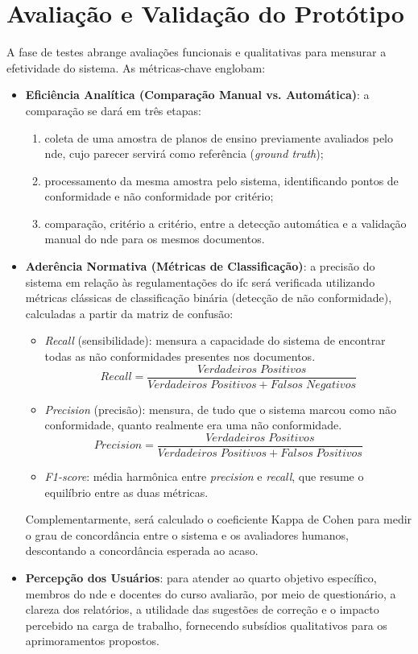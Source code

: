 \section{Avaliação e Validação do Protótipo}
A fase de testes abrange avaliações funcionais e qualitativas para mensurar a efetividade do sistema. As métricas-chave englobam:

\begin{itemize}
    \item \textbf{Eficiência Analítica (Comparação Manual vs. Automática)}: a comparação se dará em três etapas:
    \begin{enumerate}
        \item coleta de uma amostra de planos de ensino previamente avaliados pelo \gls{nde}, cujo parecer servirá como referência (\textit{ground truth});
        \item processamento da mesma amostra pelo sistema, identificando pontos de conformidade e não conformidade por critério;
        \item comparação, critério a critério, entre a detecção automática e a validação manual do \gls{nde} para os mesmos documentos.
    \end{enumerate}
    \item \textbf{Aderência Normativa (Métricas de Classificação)}: a precisão do sistema em relação às regulamentações do \gls{ifc} será verificada utilizando métricas clássicas de classificação binária (detecção de não conformidade), calculadas a partir da matriz de confusão:
    \begin{itemize}
        \item \textit{Recall} (sensibilidade): mensura a capacidade do sistema de encontrar todas as não conformidades presentes nos documentos.
        \[ Recall = \frac{Verdadeiros\; Positivos}{Verdadeiros\; Positivos + Falsos\; Negativos} \]
        \item \textit{Precision} (precisão): mensura, de tudo que o sistema marcou como não conformidade, quanto realmente era uma não conformidade.
        \[ Precision = \frac{Verdadeiros\; Positivos}{Verdadeiros\; Positivos + Falsos\; Positivos} \]
        \item \textit{F1-score}: média harmônica entre \textit{precision} e \textit{recall}, que resume o equilíbrio entre as duas métricas.
    \end{itemize}
    Complementarmente, será calculado o coeficiente Kappa de Cohen para medir o grau de concordância entre o sistema e os avaliadores humanos, descontando a concordância esperada ao acaso.
    \item \textbf{Percepção dos Usuários}: para atender ao quarto objetivo específico, membros do \gls{nde} e docentes do curso avaliarão, por meio de questionário, a clareza dos relatórios, a utilidade das sugestões de correção e o impacto percebido na carga de trabalho, fornecendo subsídios qualitativos para os aprimoramentos propostos.
\end{itemize}

